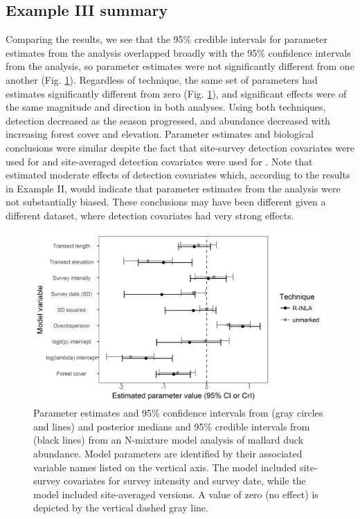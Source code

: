 \documentclass[codesnippet]{jss}
\begin{document}
\subsection[Example III summary]{Example III summary}
Comparing the results, we see that the 95\% credible intervals for parameter estimates from the  analysis overlapped broadly with the 95\% confidence intervals from the  analysis, so parameter estimates were not significantly different from one another (Fig. \ref{fig:fig3}). Regardless of technique, the same set of parameters had estimates significantly different from zero (Fig. \ref{fig:fig3}), and significant effects were of the same magnitude and direction in both analyses. Using both techniques, detection decreased as the season progressed, and abundance decreased with increasing forest cover and elevation. Parameter estimates and biological conclusions were similar despite the fact that site-survey detection covariates were used for  and site-averaged detection covariates were used for . Note that  estimated moderate effects of detection covariates which, according to the results in Example II, would indicate that parameter estimates from the  analysis were not substantially biased. These conclusions may have been different given a different dataset, where detection covariates had very strong effects.

\begin{figure}
\includegraphics[width=\linewidth]{fig3.png}
\caption{Parameter estimates and 95\% confidence intervals from  (gray circles and lines) and posterior medians and 95\% credible intervals from  (black lines) from an N-mixture model analysis of mallard duck abundance. Model parameters are identified by their associated variable names listed on the vertical axis.  The  model included site-survey covariates for survey intensity and survey date, while the  model included site-averaged versions. A value of zero (no effect) is depicted by the vertical dashed gray line.}
\label{fig:fig3}
\end{figure}
\end{document}
